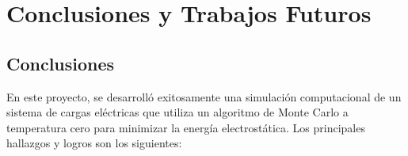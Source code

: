 
\chapter{Conclusiones y Trabajos Futuros}
\label{cap:conclusiones}

\section{Conclusiones}
En este proyecto, se desarrolló exitosamente una simulación computacional de un sistema de cargas eléctricas que utiliza un algoritmo de Monte Carlo a temperatura cero para minimizar la energía electrostática. Los principales hallazgos y logros son los siguientes:

